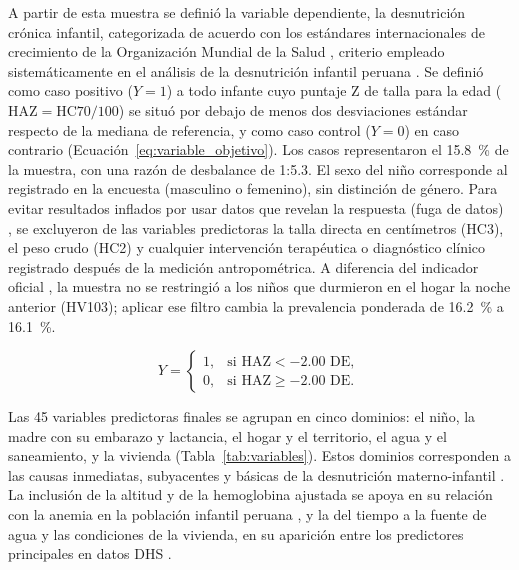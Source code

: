 \documentclass[final,5p,times,twocolumn,number,lefttitle]{elsarticle}
\begin{document}
A partir de esta muestra se definió la variable dependiente, la desnutrición crónica infantil, categorizada de acuerdo con los estándares internacionales de crecimiento de la Organización Mundial de la Salud \citep{who2006growth}, criterio empleado sistemáticamente en el análisis de la desnutrición infantil peruana \citep{sobrino2014peru,santos2021peru}. Se definió como caso positivo ($Y=1$) a todo infante cuyo puntaje Z de talla para la edad ($\mathrm{HAZ}=\mathrm{HC70}/100$) se situó por debajo de menos dos desviaciones estándar respecto de la mediana de referencia, y como caso control ($Y=0$) en caso contrario (Ecuación~\ref{eq:variable_objetivo}). Los casos representaron el 15.8~\% de la muestra, con una razón de desbalance de 1:5.3. El sexo del niño corresponde al registrado en la encuesta (masculino o femenino), sin distinción de género. Para evitar resultados inflados por usar datos que revelan la respuesta (fuga de datos) \citep{kaufman2011leakage}, se excluyeron de las variables predictoras la talla directa en centímetros (HC3), el peso crudo (HC2) y cualquier intervención terapéutica o diagnóstico clínico registrado después de la medición antropométrica. A diferencia del indicador oficial \citep{inei2023indicadores}, la muestra no se restringió a los niños que durmieron en el hogar la noche anterior (HV103); aplicar ese filtro cambia la prevalencia ponderada de 16.2~\% a 16.1~\%.

\begin{equation}
Y =
\begin{cases}
1, & \text{si } \mathrm{HAZ} < -2.00\text{ DE},\\
0, & \text{si } \mathrm{HAZ} \geq -2.00\text{ DE}.
\end{cases}
\label{eq:variable_objetivo}
\end{equation}

Las 45 variables predictoras finales se agrupan en cinco dominios: el niño, la madre con su embarazo y lactancia, el hogar y el territorio, el agua y el saneamiento, y la vivienda (Tabla~\ref{tab:variables}). Estos dominios corresponden a las causas inmediatas, subyacentes y básicas de la desnutrición materno-infantil \citep{black2013lancet,victora2021lancet}. La inclusión de la altitud y de la hemoglobina ajustada se apoya en su relación con la anemia en la población infantil peruana \citep{accinelli2020anemia}, y la del tiempo a la fuente de agua y las condiciones de la vivienda, en su aparición entre los predictores principales en datos DHS \citep{bitew2021ethiopia}.
\end{document}
